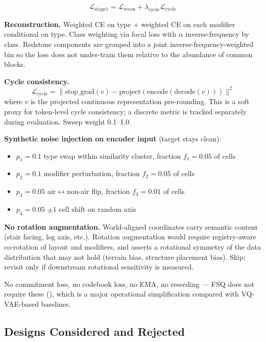 \documentclass[11pt,a4paper]{article}
\begin{document}
\[
\mathcal{L}_\text{stage1} = \mathcal{L}_\text{recon} + \lambda_\text{cycle} \mathcal{L}_\text{cycle}
\]

\textbf{Reconstruction.} Weighted CE on type + weighted CE on each modifier conditional on type. Class weighting via focal loss with $\alpha$ inverse-frequency by class. Redstone components are grouped into a joint inverse-frequency-weighted bin so the loss does not under-train them relative to the abundance of common blocks.

\textbf{Cycle consistency.}
\[
\mathcal{L}_\text{cycle} = \| \text{stop\_grad}(v) - \text{project}(\text{encode}(\text{decode}(v))) \|^2
\]
where $v$ is the projected continuous representation pre-rounding. This is a soft proxy for token-level cycle consistency; a discrete metric is tracked separately during evaluation. Sweep weight 0.1--1.0.

\textbf{Synthetic noise injection on encoder input} (target stays clean):
\begin{itemize}
  \item $p_1 = 0.1$ type swap within similarity cluster, fraction $f_1 = 0.05$ of cells
  \item $p_2 = 0.1$ modifier perturbation, fraction $f_2 = 0.05$ of cells
  \item $p_3 = 0.05$ air$\leftrightarrow$non-air flip, fraction $f_3 = 0.01$ of cells
  \item $p_4 = 0.05$ $\pm 1$ cell shift on random axis
\end{itemize}

\textbf{No rotation augmentation.} World-aligned coordinates carry semantic content (stair facing, log axis, etc.). Rotation augmentation would require registry-aware co-rotation of layout and modifiers, and asserts a rotational symmetry of the data distribution that may not hold (terrain bias, structure placement bias). Skip; revisit only if downstream rotational sensitivity is measured.

No commitment loss, no codebook loss, no EMA, no reseeding --- FSQ does not require these (\citealp{fsq}), which is a major operational simplification compared with VQ-VAE-based baselines.

\subsection{Designs Considered and Rejected}
\end{document}

